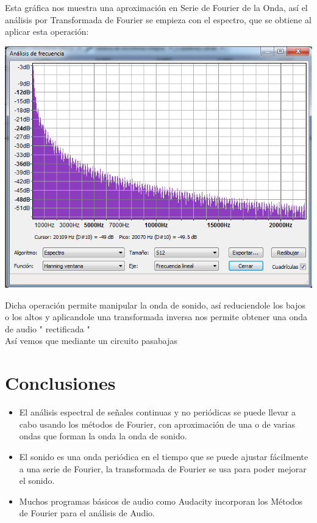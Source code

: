 \documentclass[10pt,a4paper]{book}
\begin{document}
Esta gráfica nos muestra una aproximación en Serie de Fourier de la Onda, así el análisis por Transformada de Fourier se empieza con el espectro, que se obtiene al aplicar esta operación:

\begin{center}
	\includegraphics[scale=0.5]{Espectro.png} 
\end{center}

Dicha operación permite manipular la onda de sonido, así reduciendole los bajos o los altos y aplicandole una transformada inversa nos permite obtener una onda de audio " rectificada "\\

Así vemos que mediante un circuito pasabajas 


\section{Conclusiones}

\begin{itemize}

\item El análisis espectral de señales continuas y no periódicas se puede llevar a cabo usando los métodos de Fourier, con aproximación de una o de varias ondas que forman la onda la onda de sonido.
\item El sonido es una onda periódica en el tiempo que se puede ajustar fácilmente a una serie de Fourier, la transformada de Fourier se usa para poder mejorar el sonido. 
\item Muchos programas básicos de audio como Audacity incorporan los Métodos de Fourier para el análisis de Audio.


\end{itemize}
\end{document}

